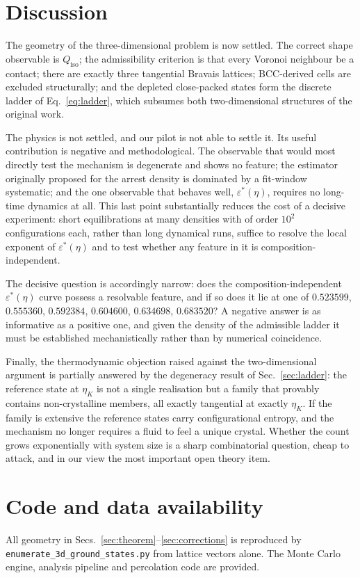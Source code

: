 \documentclass[aps,prl,twocolumn,superscriptaddress,floatfix]{revtex4-2}
\begin{document}
\section{Discussion}
\label{sec:disc}

The geometry of the three-dimensional problem is now settled. The correct shape
observable is $Q_{\mathrm{iso}}$; the admissibility criterion is that every
Voronoi neighbour be a contact; there are exactly three tangential Bravais
lattices; BCC-derived cells are excluded structurally; and the depleted
close-packed states form the discrete ladder of Eq.~\eqref{eq:ladder}, which
subsumes both two-dimensional structures of the original work.

The physics is not settled, and our pilot is not able to settle it. Its useful
contribution is negative and methodological. The observable that would most
directly test the mechanism is degenerate and shows no feature; the estimator
originally proposed for the arrest density is dominated by a fit-window
systematic; and the one observable that behaves well, $\varepsilon^*(\eta)$,
requires no long-time dynamics at all. This last point substantially reduces the
cost of a decisive experiment: short equilibrations at many densities with of
order $10^2$ configurations each, rather than long dynamical runs, suffice to
resolve the local exponent of $\varepsilon^*(\eta)$ and to test whether any
feature in it is composition-independent.

The decisive question is accordingly narrow: does the composition-independent
$\varepsilon^*(\eta)$ curve possess a resolvable feature, and if so does it lie at
one of $0.523599$, $0.555360$, $0.592384$, $0.604600$, $0.634698$, $0.683520$? A
negative answer is as informative as a positive one, and given the density of the
admissible ladder it must be established mechanistically rather than by numerical
coincidence.

Finally, the thermodynamic objection raised against the two-dimensional
argument is partially answered by the degeneracy result of
Sec.~\ref{sec:ladder}: the reference state at $\eta_K$ is not a single
realisation but a family that provably contains non-crystalline members, all
exactly tangential at exactly $\eta_K$. If the family is extensive the
reference states carry configurational entropy, and the mechanism no longer
requires a fluid to feel a unique crystal. Whether the count grows
exponentially with system size is a sharp combinatorial question, cheap to
attack, and in our view the most important open theory item.

\section*{Code and data availability}

All geometry in Secs.~\ref{sec:theorem}--\ref{sec:corrections} is reproduced by
\texttt{enumerate\_3d\_ground\_states.py} from lattice vectors alone. The Monte
Carlo engine, analysis pipeline and percolation code are provided.
\end{document}
